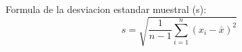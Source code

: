 
Formula de la desviacion estandar muestral (s): 
\[
s = \sqrt{\frac{1}{n-1} \sum_{i=1}^{n} (x_i - \bar{x})^2}
\]
